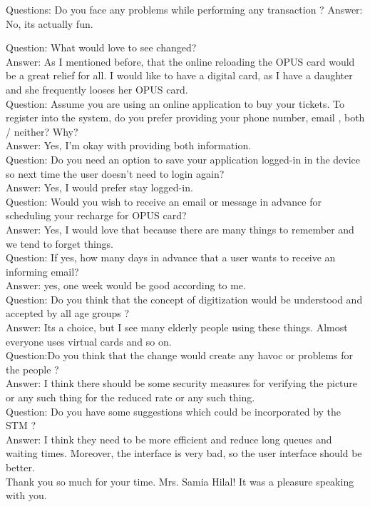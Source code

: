\documentclass[11pt, english]{report}
\begin{document}
Questions: Do you face any problems while performing any transaction ?
Answer: No, its actually fun.

Question: What would love to see changed?\\
Answer: As I mentioned before, that the online reloading the OPUS card would be a great relief for all. I would like to have a digital card, as I have a daughter and she frequently looses her OPUS card.\\

Question: Assume you are using an online application to buy your tickets. To register into the system, do you prefer providing your phone number, email , both / neither? Why?\\
Answer: Yes, I'm okay with providing both information.\\
 

 
Question: Do you  need an option to save your application logged-in in the device so next time the user doesn’t need to login again?\\
Answer: Yes, I would prefer stay logged-in.\\

Question: Would you wish to receive an email or message in advance for scheduling your recharge for OPUS card?\\
Answer: Yes, I would love that because there are many things to remember and we tend to forget things.\\
 
 
Question: If yes, how many days in advance that a user wants to receive an informing email?\\
Answer: yes, one week would be good according to me.\\

Question: Do you think that the concept of digitization would be understood and accepted by all age groups ?\\
Answer: Its a choice, but I see many elderly people using these things. Almost everyone uses virtual cards and so on.\\

Question:Do you think that the change would create any havoc or problems for the people ?\\
Answer: I think there should be some security measures for verifying the picture or any such thing for the reduced rate or any such thing.\\

Question: Do you have some suggestions which could be incorporated by the STM ?\\
Answer: I think they need to be more efficient and reduce long queues and waiting times. Moreover, the interface is very bad, so the user interface should be better.\\
Thank you so much for your time. Mrs. Samia Hilal! It was a pleasure speaking with you. \\
\end{document}

